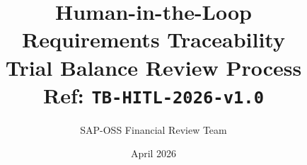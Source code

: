 \documentclass[11pt,a4paper,twoside]{report}
\begin{document}
\title{\vspace{-2em}\Large Human-in-the-Loop \\
       \textbf{Requirements Traceability} \\
       \large Trial Balance Review Process \\
       \small Ref: \texttt{TB-HITL-2026-v1.0}}
\author{SAP-OSS Financial Review Team}
\date{April 2026}

\maketitle






















\end{document}
